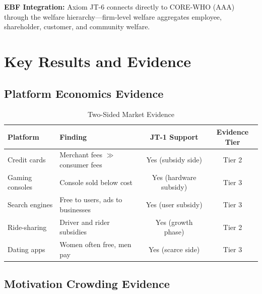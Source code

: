 \textbf{EBF Integration:} Axiom JT-6 connects directly to CORE-WHO (AAA) through the welfare hierarchy---firm-level welfare aggregates employee, shareholder, customer, and community welfare.

\section{Key Results and Evidence}
\label{sec:jt-results}

\subsection{Platform Economics Evidence}

\begin{table}[htbp]
\centering
\caption{Two-Sided Market Evidence}
\label{tab:jt-platform-evidence}
\begin{tabular}{llcc}
\toprule
\textbf{Platform} & \textbf{Finding} & \textbf{JT-1 Support} & \textbf{Evidence Tier} \\
\midrule
Credit cards & Merchant fees $\gg$ consumer fees & Yes (subsidy side) & Tier 2 \\
Gaming consoles & Console sold below cost & Yes (hardware subsidy) & Tier 3 \\
Search engines & Free to users, ads to businesses & Yes (user subsidy) & Tier 3 \\
Ride-sharing & Driver and rider subsidies & Yes (growth phase) & Tier 2 \\
Dating apps & Women often free, men pay & Yes (scarce side) & Tier 3 \\
\bottomrule
\end{tabular}
\end{table}

\subsection{Motivation Crowding Evidence}

